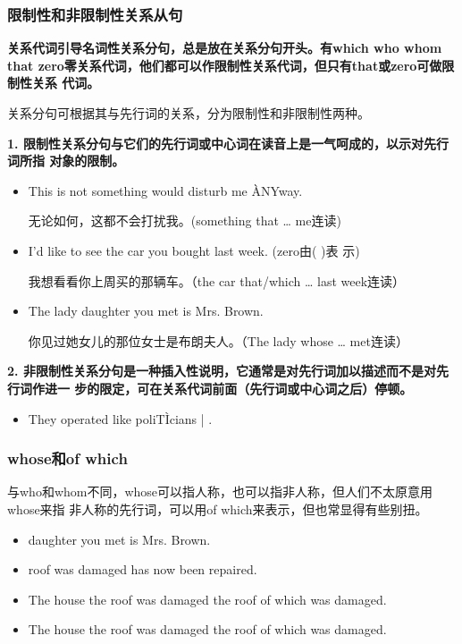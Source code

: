 \subsubsection{限制性和非限制性关系从句}

\textbf{关系代词引导名词性关系分句，总是放在关系分句开头。有which who whom that
  zero零关系代词，他们都可以作限制性关系代词，但只有that或zero可做限制性关系
  代词。}

关系分句可根据其与先行词的关系，分为限制性和非限制性两种。

\textbf{1. 限制性关系分句与它们的先行词或中心词在读音上是一气呵成的，以示对先行词所指
  对象的限制。}
\begin{itemize}
\item This is not something  would disturb me \`{A}NYway.

  无论如何，这都不会打扰我。(something that \ldots{} me连读)
\item I'd like to see the car  you bought last week. (zero由( )表
  示)

  我想看看你上周买的那辆车。（the car that/which \ldots{} last week连读）
\item The lady  daughter you met is Mrs. Brown.

  你见过她女儿的那位女士是布朗夫人。（The lady whose \ldots{} met连读）
\end{itemize}

\textbf{2. 非限制性关系分句是一种插入性说明，它通常是对先行词加以描述而不是对先行词作进一
  步的限定，可在关系代词前面（先行词或中心词之后）停顿。}
\begin{itemize}
\item  They operated like poliT\`{I}cians | .
\end{itemize}

\subsubsection{whose和of which}

与who和whom不同，whose可以指人称，也可以指非人称，但人们不太原意用whose来指
非人称的先行词，可以用of which来表示，但也常显得有些别扭。
\begin{itemize}
\item {} daughter you met is Mrs. Brown.
\item {} roof was damaged has now been repaired.
\item The house  the roof was damaged the roof of which was damaged.
\item The house the roof  was damaged the roof of which was damaged.
\end{itemize}

